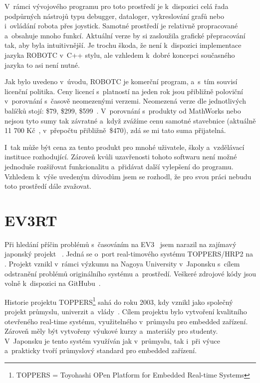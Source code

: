 V~rámci vývojového programu pro toto prostředí je k~dispozici celá řada podpůrných nástrojů typu debugger, dataloger, vykreslování grafů nebo i~ovládání robota přes joystick.
Samotné prostředí je relativně propracované a~obsahuje mnoho funkcí. 
Aktuální verze by si zasloužila grafické přepracování tak, aby byla intuitivnější. 
Je trochu škoda, že není k~dispozici implementace jazyka ROBOTC v~C++ stylu, ale vzhledem k~dobré koncepci současného jazyka to asi není nutné. 

Jak bylo uvedeno v~úvodu, ROBOTC je komerční program, a~s~tím souvisí licenční politika. 
Ceny licencí s~platností na jeden rok jsou přibližně poloviční v~porovnání s~časově neomezenými verzemi.
Neomezená verze dle jednotlivých balíčků stojí: \$79, \$299, \$599~\cite{legoProgramingPlatform_ROBOTC-price}.  
V~porovnání s~produkty od MathWorks nebo \NI{} nejsou tyto sumy tak závratné a~když zvážíme cenu samotné stavebnice \legoEV{} (aktuálně 11 700 Kč~\cite{lego_eduxeEshop_CoreSet}, v~přepočtu přibližně~\$470), zdá se mi tato suma přijatelná.

I~tak může být cena za tento produkt pro mnohé uživatele, školy a~vzdělávací instituce rozhodující.
Zároveň kvůli uzavřenosti tohoto softwaru není možné jednoduše rozšiřovat funkcionalitu a~přidávat další vylepšení do programu. 
Vzhledem k~výše uvedeným důvodům jsem se rozhodl, že pro svou práci nebudu toto prostředí dále zvažovat.	


\section{EV3RT}
\label{lego-EV3RT}

Při hledání příčin problémů s~časováním na EV3~\cite{legoMindstormsEV3_ev3dev-issue_constant-loop-time} jsem narazil na zajímavý japonský projekt \evRT{}~\cite{legoProgramingPlatform_EV3RT-git-web}.
Jedná se o~port real-timového systému TOPPERS/HRP2 na \legoEV{}.
Projekt \evRT{} vznikl v~rámci výzkumu na Nagoya University v~Japonsku s~cílem odstranění problémů originálního \lego{} systému a~prostředí. 
Veškeré zdrojové kódy jsou volně k~dispozici na GitHubu~\cite{legoProgramingPlatform_EV3RT-github}. 

Historie projektu TOPPERS\footnote{TOPPERS = Toyohashi OPen Platform for Embedded Real-time Systems} sahá do roku 2003, kdy vznikl jako společný projekt průmyslu, univerzit a~vlády~\cite{legoProgramingPlatform_TOPPERS}. 
Cílem projektu bylo vytvoření kvalitního otevřeného real-time systému, využitelného v~průmyslu pro embedded zařízení. 
Zároveň měly být vytvořeny výukové kurzy a~materiály pro studenty.
V~Japonsku je tento systém využíván jak v~průmyslu, tak i~při výuce a~prakticky tvoří průmyslový standard pro embedded zařízení. 

